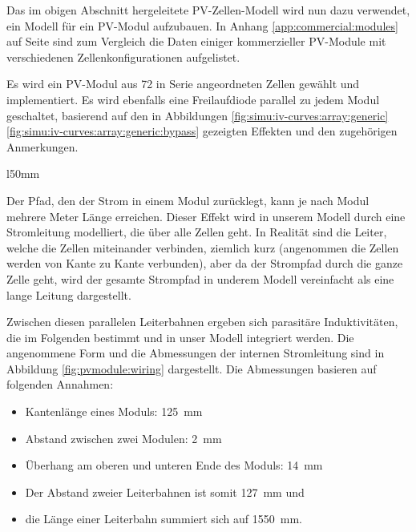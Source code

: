 Das  im   obigen  Abschnitt   hergeleitete  PV-Zellen-Modell  wird   nun  dazu
verwendet,   ein    Modell   f\"ur   ein   PV-Modul    aufzubauen. In   Anhang
\ref{app:commercial:modules}  auf Seite  \pageref{app:commercial:modules} sind
zum  Vergleich die  Daten  einiger kommerzieller  PV-Module mit  verschiedenen
Zellenkonfigurationen aufgelistet.

Es     wird    ein     PV-Modul     aus    72     in    Serie     angeordneten
Zellen    gew\"ahlt     und    implementiert. Es    wird     ebenfalls    eine
Freilaufdiode    parallel    zu     jedem    Modul    geschaltet,    basierend
auf     den      in     Abbildungen     \ref{fig:simu:iv-curves:array:generic}
\ref{fig:simu:iv-curves:array:generic:bypass}   gezeigten  Effekten   und  den
zugeh\"origen Anmerkungen.

\begin{wrapfigure}{l}{50mm}
    \centering
    
    \caption[PV-Modul, Modell f\"ur den Strompfad]{
        Solarmodul  gem\"ass Abbildung  \ref{fig:pvmodule} mit  Stromleitungen
        und  L\"angen   zur  Verbindung   der  Zellen. Die   Nummerierung  der
        Leiterbahnen   entspricht    der   Nummerierung    der   Koeffizienten
        in   Gleichungen   \ref{eq:rosa:a1}    bis   \ref{eq:rosa:a3}   (Seite
        \pageref{eq:rosa:a1}).%
    }
    \label{fig:pvmodule:wiring}
    \vspace*{-3em}
\end{wrapfigure}

Der  Pfad, den  der Strom  in  einem Modul  zur\"ucklegt, kann  je nach  Modul
mehrere Meter L\"ange  erreichen.  Dieser Effekt wird in  unserem Modell durch
eine Stromleitung modelliert, die \"uber  alle Zellen geht. In Realit\"at sind
die Leiter, welche die Zellen miteinander verbinden, ziemlich kurz (angenommen
die Zellen werden  von Kante zu Kante verbunden), aber  da der Strompfad durch
die ganze Zelle geht, wird der gesamte Strompfad in underem Modell vereinfacht
als eine lange Leitung dargestellt.

Zwischen   diesen   parallelen    Leiterbahnen   ergeben   sich   parasit\"are
Induktivit\"aten, die  im Folgenden  bestimmt und  in unser  Modell integriert
werden.  Die  angenommene Form und  die Abmessungen der  internen Stromleitung
sind  in  Abbildung   \ref{fig:pvmodule:wiring}  dargestellt. Die  Abmessungen
basieren auf folgenden Annahmen:

\begin{itemize}
    \tightlist
    \item
        Kantenl\"ange eines Moduls: \SI{125}{\milli\meter}
    \item
        Abstand zwischen zwei Modulen: \SI{2}{\milli\meter}
    \item
        \"Uberhang      am      oberen      und     unteren      Ende      des
        Moduls: \SI{14}{\milli\meter}
    \item
        Der Abstand zweier Leiterbahnen ist somit \SI{127}{\milli\meter} und
    \item
        die     L\"ange     einer     Leiterbahn     summiert     sich     auf
        \SI{1550}{\milli\meter}.
\end{itemize}


